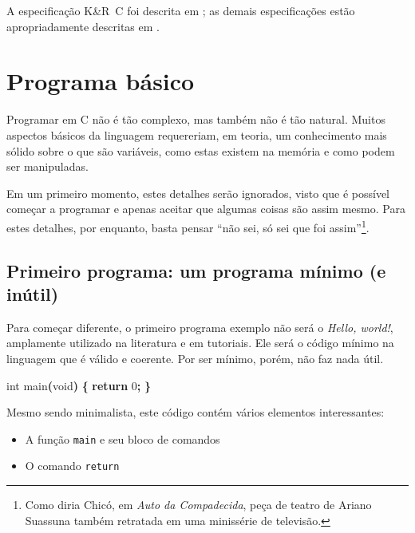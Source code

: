 \documentclass[
  11pt,
  a4paper,
]{scrbook}
\newenvironment{Shaded}{\begin{snugshade}}{\end{snugshade}}
\newcommand{\ControlFlowTok}[1]{\textcolor[rgb]{0.13,0.29,0.53}{\textbf{#1}}}
\newcommand{\DataTypeTok}[1]{\textcolor[rgb]{0.13,0.29,0.53}{#1}}
\newcommand{\DecValTok}[1]{\textcolor[rgb]{0.00,0.00,0.81}{#1}}
\newcommand{\NormalTok}[1]{#1}
\newcommand{\OperatorTok}[1]{\textcolor[rgb]{0.81,0.36,0.00}{\textbf{#1}}}
\providecommand{\tightlist}{%
  \setlength{\itemsep}{0pt}\setlength{\parskip}{0pt}}\usepackage{longtable,booktabs,array}
\begin{document}
A especificação K\&R~C foi descrita em \textcite{ritchie1978}; as demais
especificações estão apropriadamente descritas em
\textcite{cprogramminglanguage}.

\section{Programa básico}\label{programa-buxe1sico}

Programar em C não é tão complexo, mas também não é tão natural. Muitos
aspectos básicos da linguagem requereriam, em teoria, um conhecimento
mais sólido sobre o que são variáveis, como estas existem na memória e
como podem ser manipuladas.

Em um primeiro momento, estes detalhes serão ignorados, visto que é
possível começar a programar e apenas aceitar que algumas coisas são
assim mesmo. Para estes detalhes, por enquanto, basta pensar ``não sei,
só sei que foi assim''\footnote{Como diria Chicó, em \emph{Auto da
  Compadecida}, peça de teatro de Ariano Suassuna também retratada em
  uma minissérie de televisão.}.

\subsection{Primeiro programa: um programa mínimo (e
inútil)}\label{sec-programa-minimo}

Para começar diferente, o primeiro programa exemplo não será o
\emph{Hello, world!}, amplamente utilizado na literatura e em tutoriais.
Ele será o código mínimo na linguagem que é válido e coerente. Por ser
mínimo, porém, não faz nada útil.

\begin{Shaded}
\begin{Highlighting}[]
\DataTypeTok{int}\NormalTok{ main}\OperatorTok{(}\DataTypeTok{void}\OperatorTok{)} \OperatorTok{\{}
    \ControlFlowTok{return} \DecValTok{0}\OperatorTok{;}
\OperatorTok{\}}
\end{Highlighting}
\end{Shaded}

Mesmo sendo minimalista, este código contém vários elementos
interessantes:

\begin{itemize}
\tightlist
\item
  A função \texttt{main} e seu bloco de comandos
\item
  O comando \texttt{return}
\end{itemize}
\end{document}
